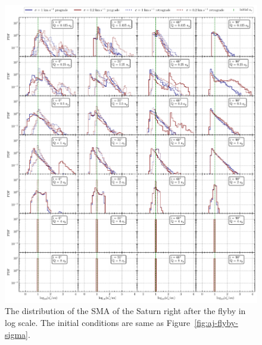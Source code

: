 \documentclass[twocolumn]{aastex63}
\newcommand*\fgr[1]{Figure~\ref{#1}}
\begin{document}
\begin{figure}
    \includegraphics[width=\textwidth]{figs/as-flyby-sigma.pdf}
    \caption{The distribution of the SMA of the Saturn right after the flyby in log scale. The initial conditions are same as \fgr{fig:aj-flyby-sigma}.}
    \label{fig:at-flyby-sigma}
\end{figure}
\end{document}
